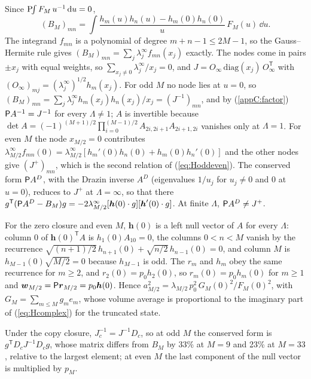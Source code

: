Since $\mathrm{P}\!\!\int F_M\,u^{-1}\,\mathrm{d} u=0$,
\begin{equation*}
  (B_M)_{mn}=\int\frac{h_m(u)h_n(u)-h_m(0)h_n(0)}{u}\,F_M(u)\,\dd u .
\end{equation*}
The integrand $f_{mn}$ is a polynomial of degree $m+n-1\le2M-1$, so the Gauss--Hermite rule gives $(B_M)_{mn}=\sum_j\lambda^\infty_jf_{mn}(x_j)$ exactly. The nodes come in pairs $\pm x_j$ with equal weights, so $\sum_{x_j\neq0}\lambda^\infty_j/x_j=0$, and $J=O_\infty\,\mathrm{diag}(x_j)\,O_\infty^{\mathsf T}$ with $(O_\infty)_{mj}=(\lambda^\infty_j)^{1/2}h_m(x_j)$. For odd $M$ no node lies at $u=0$, so $(B_M)_{mn}=\sum_j\lambda^\infty_jh_m(x_j)h_n(x_j)/x_j=(J^{-1})_{mn}$, and by (\ref{appC:factor}) $\mathsf P A^{-1}=J^{-1}$ for every $\Lambda\neq1$; $A$ is invertible because $\det A=(-1)^{(M+1)/2}\prod_{i=0}^{(M-1)/2}A_{2i,2i+1}A_{2i+1,2i}$ vanishes only at $\Lambda=1$. For even $M$ the node $x_{M/2}=0$ contributes $\lambda^\infty_{M/2}f_{mn}(0)=\lambda^\infty_{M/2}[h_m'(0)h_n(0)+h_m(0)h_n'(0)]$ and the other nodes give $(J^+)_{mn}$, which is the second relation of (\ref{eq:Hoddeven}). The conserved form $\mathsf P A^D$, with the Drazin inverse $A^D$ (eigenvalues $1/u_j$ for $u_j\neq0$ and $0$ at $u=0$), reduces to $J^+$ at $\Lambda=\infty$, so that there $g^{\mathsf T}(\mathsf P A^D-B_M)g=-2\lambda^\infty_{M/2}[\boldsymbol h(0)\cdot g][\boldsymbol h'(0)\cdot g]$. At finite $\Lambda$, $\mathsf P A^D\neq J^+$.

For the zero closure and even $M$, $\boldsymbol h(0)$ is a left null vector of $A$ for every $\Lambda$: column $0$ of $\boldsymbol h(0)^{\mathsf T}A$ is $h_1(0)A_{10}=0$, the columns $0<n<M$ vanish by the recurrence $\sqrt{(n+1)/2}\,h_{n+1}(0)+\sqrt{n/2}\,h_{n-1}(0)=0$, and column $M$ is $h_{M-1}(0)\sqrt{M/2}=0$ because $h_{M-1}$ is odd. The $r_m$ and $h_m$ obey the same recurrence for $m\ge2$, and $r_2(0)=p_0h_2(0)$, so $r_m(0)=p_0h_m(0)$ for $m\ge1$ and $\boldsymbol w_{M/2}=\mathsf P\boldsymbol r_{M/2}=p_0\boldsymbol h(0)$. Hence $a_{M/2}^2=\lambda_{M/2}\,p_0^2\,G_M(0)^2/F_M(0)^2$, with $G_M=\sum_{m\le M}g_me_m$, whose volume average is proportional to the imaginary part of (\ref{eq:Hcomplex}) for the truncated state.

Under the copy closure, $J_c^{-1}=J^{-1}D_c$, so at odd $M$ the conserved form is $g^{\mathsf T}D_cJ^{-1}D_cg$, whose matrix differs from $B_M$ by 33\% at $M=9$ and 23\% at $M=33$, relative to the largest element; at even $M$ the last component of the null vector is multiplied by $p_M$.
